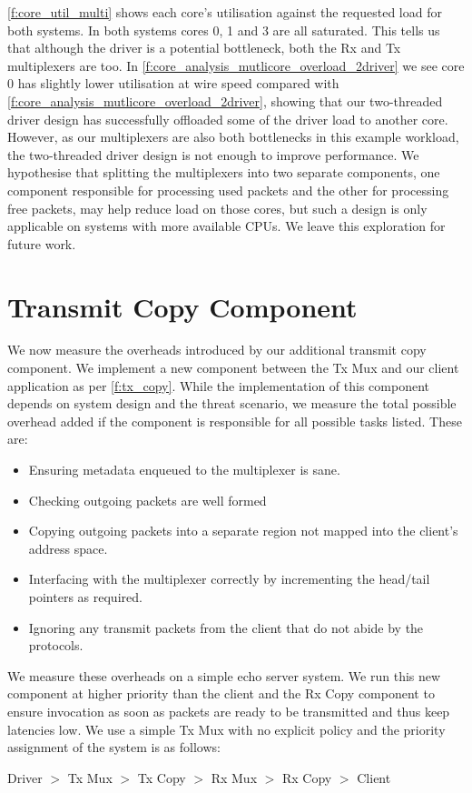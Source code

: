 \autoref{f:core_util_multi} shows each core's utilisation against the requested load for both systems. 
In both systems cores 0, 1 and 3 are all saturated. This tells us that although the driver is a potential
bottleneck, both the Rx and Tx multiplexers are too. In \autoref{f:core_analysis_mutlicore_overload_2driver}
we see core 0 has slightly lower utilisation at wire speed compared with
\autoref{f:core_analysis_mutlicore_overload_2driver}, showing that our two-threaded driver design has successfully
offloaded some of the driver load to another core. However, as our multiplexers are also both bottlenecks in 
this example workload, the two-threaded driver design is not enough to improve performance. We hypothesise that
splitting the multiplexers into two separate components, one component responsible for processing used packets and 
the other for processing free packets, may help reduce load on those cores, but such a design is only applicable
on systems with more available CPUs. We leave this exploration for future work.

\section{Transmit Copy Component}

We now measure the overheads introduced by our additional transmit copy component. We implement a new
component between the Tx Mux and our client application as per \autoref{f:tx_copy}. While the implementation
of this component depends on system design and the threat scenario, we measure the total possible overhead
added if the component is responsible for all possible tasks listed. These are:
\begin{itemize}
    \item Ensuring metadata enqueued to the multiplexer is sane.
    \item Checking outgoing packets are well formed 
    \item Copying outgoing packets into a separate region not mapped
          into the client's address space.
    \item Interfacing with the multiplexer correctly by incrementing the head/tail pointers as required.
    \item Ignoring any transmit packets from the client that do not abide by the protocols.
\end{itemize}

We measure these overheads on a simple echo server system. We run this new component at higher priority than the client
and the Rx Copy component to ensure invocation as soon as packets are ready to be transmitted and thus keep
latencies low. We use a simple Tx Mux with no explicit policy and the priority assignment of the system is as follows:\\
\centerline{Driver \(>\) Tx Mux  \(>\) Tx Copy \(>\) Rx Mux \(>\) Rx Copy \(>\) Client}

